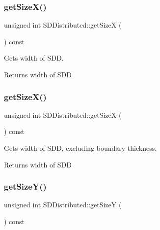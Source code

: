 \subsubsection{\texorpdfstring{get\+Size\+X()}{getSizeX()}\hspace{0.1cm}{\footnotesize\ttfamily [1/2]}}
{\footnotesize\ttfamily unsigned int S\+D\+Distributed\+::get\+SizeX (\begin{DoxyParamCaption}{ }\end{DoxyParamCaption}) const}



Gets width of S\+DD. 

\begin{DoxyReturn}{Returns}
width of S\+DD 
\end{DoxyReturn}
\mbox{\label{classSDDistributed_a567b9535558271515166ce7ebd3f6c29}} 
\subsubsection{\texorpdfstring{get\+Size\+X()}{getSizeX()}\hspace{0.1cm}{\footnotesize\ttfamily [2/2]}}
{\footnotesize\ttfamily unsigned int S\+D\+Distributed\+::get\+SizeX (\begin{DoxyParamCaption}{ }\end{DoxyParamCaption}) const}



Gets width of S\+DD, excluding boundary thickness. 

\begin{DoxyReturn}{Returns}
width of S\+DD 
\end{DoxyReturn}
\mbox{\label{classSDDistributed_a9bf0049f4c95513b4d9c9a9bac0f6eb4}} 
\subsubsection{\texorpdfstring{get\+Size\+Y()}{getSizeY()}\hspace{0.1cm}{\footnotesize\ttfamily [1/2]}}
{\footnotesize\ttfamily unsigned int S\+D\+Distributed\+::get\+SizeY (\begin{DoxyParamCaption}{ }\end{DoxyParamCaption}) const}



